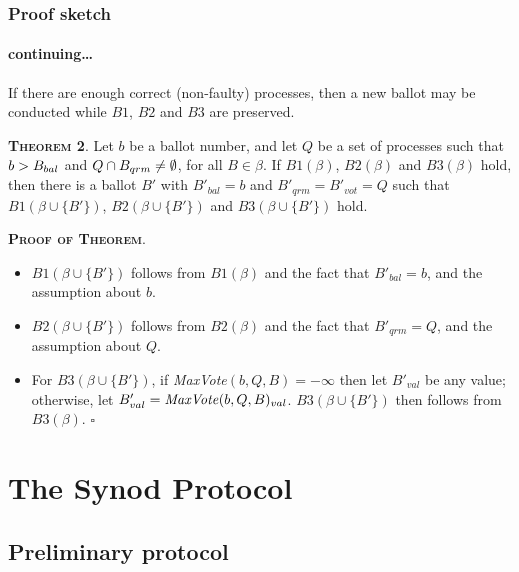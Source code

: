 \documentclass[10 pt]{beamer}
\begin{document}
\begin{frame}
\frametitle{Proof sketch}
\framesubtitle{continuing\ldots}

If there are enough correct (non-faulty) processes, then a new ballot may be conducted while $B1$, $B2$ and $B3$ are preserved.

\vspace{2 mm}
\textbf{\textsc{Theorem 2}}. Let $b$ be a ballot number, and let $Q$ be a set of processes such that $b > B_{bal}$ and $Q \cap B_{qrm} \neq \emptyset$, for all $B \in \beta$. If $B1(\beta)$, $B2(\beta)$ and $B3(\beta)$ hold, then there is a ballot $B'$ with $B'_{bal} = b$ and $B'_{qrm} = B'_{vot} = Q$ such that $B1(\beta \cup \{B'\})$, $B2(\beta \cup \{B'\})$ and $B3(\beta \cup \{B'\})$ hold.

\vspace{2 mm}
\textbf{\textsc{Proof of Theorem}}.
\begin{itemize}
\item $B1(\beta \cup \{B'\})$ follows from $B1(\beta)$ and the fact that $B'_{bal} = b$, and the assumption about $b$.
\item $B2(\beta \cup \{B'\})$ follows from $B2(\beta)$ and the fact that $B'_{qrm} = Q$, and the assumption about $Q$.
\item For $B3(\beta \cup \{B'\})$, if \textit{MaxVote}$(b,Q,B) = -\infty$ then let $B'_{val}$ be any value; otherwise, let $B'_{val} = \text{\textit{MaxVote}}(b,Q,B)_{val}$. $B3(\beta \cup \{B'\})$ then follows from $B3(\beta)$. $\square$
\end{itemize} 
\end{frame}



\section{The Synod Protocol}

\subsection{Preliminary protocol}
\end{document}
